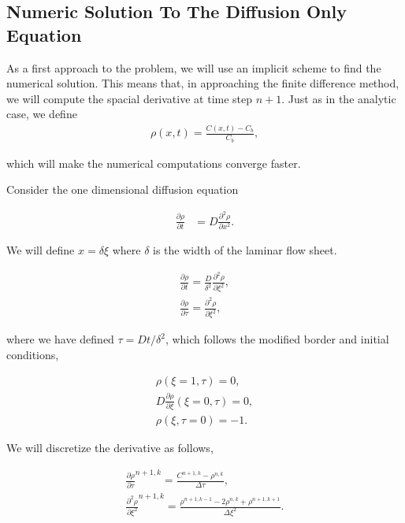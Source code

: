 \subsection{Numeric Solution To The Diffusion Only Equation}


\par As a first approach to the problem, we will use an implicit scheme to find the numerical solution. This means that, in approaching the finite difference method, we will compute the spacial derivative at time step $n+1$. 
Just as in the analytic case, we define
\begin{align}
	\rho(x,t) = \frac{C(x,t) - C_b}{C_b},
\end{align}

which will make the numerical computations converge faster.



Consider the one dimensional diffusion equation

\begin{align}
\frac{\partial \rho}{\partial t} &= D \frac{\partial^2 \rho}{\partial x^2}.
\label{eq:diffusion}
\end{align}

We will define $x = \delta \xi$ where $\delta$ is the width of the laminar flow sheet. 

\begin{align}
\frac{\partial \rho}{\partial t} = \frac{D}{\delta^2} \frac{\partial^2 \rho}{\partial \xi^2},\\
\frac{\partial \rho}{\partial \tau} = \frac{\partial^2 \rho}{\partial \xi^2},
\end{align}

where we have defined $\tau = Dt/\delta^2$, which follows the modified border and initial conditions,

\begin{align}
	\rho(\xi = 1, \tau) = 0, \\
	D \frac{\partial \rho}{\partial \xi} (\xi = 0, \tau) = 0,\\
	\rho(\xi, \tau = 0) = -1.
\end{align}


We will discretize the derivative as follows,

\begin{align}
\frac{\partial \rho}{\partial \tau}^{n+1, k}= \frac{C^{n+1, k}-\rho^{n, k}}{\Delta \tau},\\
\frac{\partial^2 \rho}{\partial \xi^2}^{n+1, k} = \frac{\rho^{n+1, k-1}-2\rho^{n, k}+\rho^{n+1, k+1}}{\Delta \xi^2}.
\end{align}

